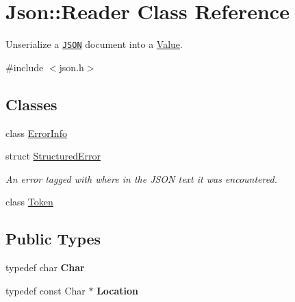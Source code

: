 \hypertarget{class_json_1_1_reader}{}\section{Json\+:\+:Reader Class Reference}
\label{class_json_1_1_reader}


Unserialize a \href{http://www.json.org}{\tt J\+S\+O\+N} document into a \hyperlink{class_json_1_1_value}{Value}.  




{\ttfamily \#include $<$json.\+h$>$}

\subsection*{Classes}
\begin{DoxyCompactItemize}
\item 
class \hyperlink{class_json_1_1_reader_1_1_error_info}{Error\+Info}
\item 
struct \hyperlink{struct_json_1_1_reader_1_1_structured_error}{Structured\+Error}
\begin{DoxyCompactList}\small\item\em An error tagged with where in the J\+S\+O\+N text it was encountered. \end{DoxyCompactList}\item 
class \hyperlink{class_json_1_1_reader_1_1_token}{Token}
\end{DoxyCompactItemize}
\subsection*{Public Types}
\begin{DoxyCompactItemize}
\item 
\hypertarget{class_json_1_1_reader_a3eec9118f3e9a672ba8348c3a79d0f45}{}typedef char {\bfseries Char}\label{class_json_1_1_reader_a3eec9118f3e9a672ba8348c3a79d0f45}

\item 
\hypertarget{class_json_1_1_reader_a46795b5b272bf79a7730e406cb96375a}{}typedef const Char $\ast$ {\bfseries Location}\label{class_json_1_1_reader_a46795b5b272bf79a7730e406cb96375a}

\end{DoxyCompactItemize}
